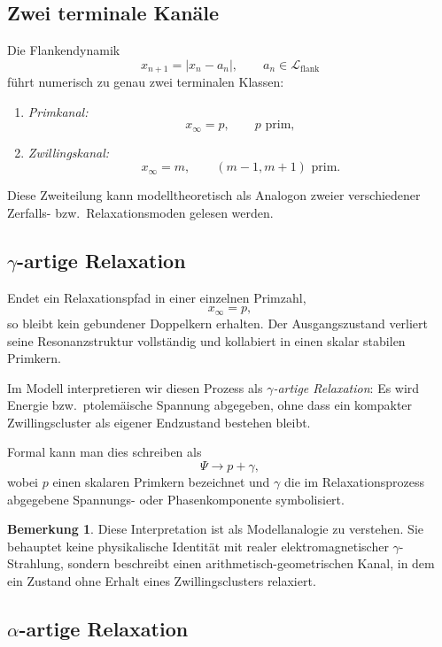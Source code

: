 \documentclass[11pt,a4paper]{article}
\theoremstyle{definition}
\newtheorem{remark}[definition]{Bemerkung}
\theoremstyle{plain}
\theoremstyle{remark}
\begin{document}
	\subsection{Zwei terminale Kanäle}
	
	Die Flankendynamik
	\[
	x_{n+1}=|x_n-a_n|,
	\qquad a_n\in\mathcal L_{\mathrm{flank}}
	\]
	führt numerisch zu genau zwei terminalen Klassen:
	
	\begin{enumerate}
		\item \emph{Primkanal:}
		\[
		x_\infty = p,
		\qquad p \text{ prim},
		\]
		\item \emph{Zwillingskanal:}
		\[
		x_\infty = m,
		\qquad (m-1,m+1)\text{ prim}.
		\]
	\end{enumerate}
	
	Diese Zweiteilung kann modelltheoretisch als Analogon zweier verschiedener Zerfalls- bzw.\ Relaxationsmoden gelesen werden.
	
	\subsection{\texorpdfstring{$\gamma$}{gamma}-artige Relaxation}
	
	Endet ein Relaxationspfad in einer einzelnen Primzahl,
	\[
	x_\infty=p,
	\]
	so bleibt kein gebundener Doppelkern erhalten. 
	Der Ausgangszustand verliert seine Resonanzstruktur vollständig und kollabiert in einen skalar stabilen Primkern.
	
	Im Modell interpretieren wir diesen Prozess als \emph{\(\gamma\)-artige Relaxation}:
	Es wird Energie bzw.\ ptolemäische Spannung abgegeben, ohne dass ein kompakter Zwillingscluster als eigener Endzustand bestehen bleibt.
	
	Formal kann man dies schreiben als
	\[
	\Psi \longrightarrow p + \gamma,
	\]
	wobei \(p\) einen skalaren Primkern bezeichnet und \(\gamma\) die im Relaxationsprozess abgegebene Spannungs- oder Phasenkomponente symbolisiert.
	
	\begin{remark}
		Diese Interpretation ist als Modellanalogie zu verstehen. 
		Sie behauptet keine physikalische Identität mit realer elektromagnetischer \(\gamma\)-Strahlung, sondern beschreibt einen arithmetisch-geometrischen Kanal, in dem ein Zustand ohne Erhalt eines Zwillingsclusters relaxiert.
	\end{remark}
	
	\subsection{\texorpdfstring{$\alpha$}{alpha}-artige Relaxation}
	
\end{document}
